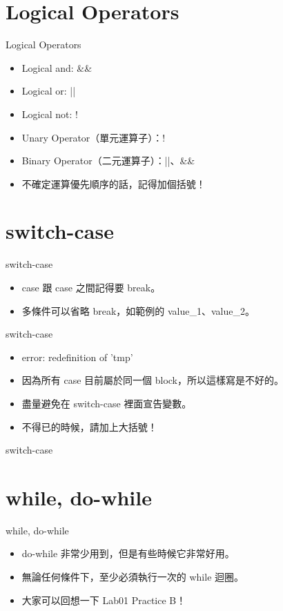 \documentclass[t]{beamer}
\begin{document}
\section{Logical Operators}
\begin{frame}{Logical Operators}
  \begin{itemize}
    \item Logical and: \&\&
    \item Logical or: ||
    \item Logical not: !
    \item Unary Operator（單元運算子）：!
    \item Binary Operator（二元運算子）：||、\&\&
    \item 不確定運算優先順序的話，記得加個括號！
  \end{itemize}
\end{frame}

\section{switch-case}
\begin{frame}{switch-case}
  
  \begin{itemize}
    \item case 跟 case 之間記得要 break。
    \item 多條件可以省略 break，如範例的 value\_1、value\_2。
  \end{itemize}
\end{frame}

\begin{frame}{switch-case}
  
  \begin{itemize}
    \item error: redefinition of 'tmp'
    \item 因為所有 case 目前屬於同一個 block，所以這樣寫是不好的。
    \item 盡量避免在 switch-case 裡面宣告變數。
    \item 不得已的時候，請加上大括號！
  \end{itemize}
\end{frame}

\begin{frame}{switch-case}
  
\end{frame}

\section{while, do-while}
\begin{frame}{while, do-while}
  \begin{itemize}
    \item do-while 非常少用到，但是有些時候它非常好用。
    \item 無論任何條件下，至少必須執行一次的 while 迴圈。
    \item 大家可以回想一下 Lab01 Practice B！
  \end{itemize}
\end{frame}
\end{document}
